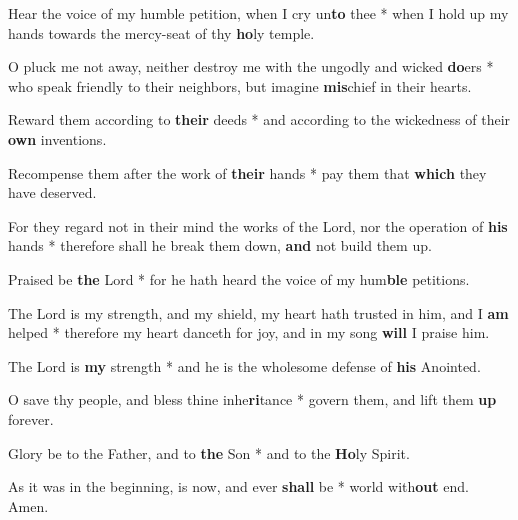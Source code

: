\begin{multicols}{2}
	Hear the voice of my humble petition, when I cry un\textbf{to} thee * when I hold up my hands towards the mercy-seat of thy \textbf{ho}ly temple.
	
	O pluck me not away, neither destroy me with the ungodly and wicked \textbf{do}ers * who speak friendly to their neighbors, but imagine \textbf{mis}chief in their hearts.
	
	Reward them according to \textbf{their} deeds * and according to the wickedness of their \textbf{own} inventions.
	
	Recompense them after the work of \textbf{their} hands * pay them that \textbf{which} they have deserved.
	
	For they regard not in their mind the works of the Lord, nor the operation of \textbf{his} hands * therefore shall he break them down, \textbf{and} not build them up.
	
	Praised be \textbf{the} Lord * for he hath heard the voice of my hum\textbf{ble} petitions.
	
	The Lord is my strength, and my shield, my heart hath trusted in him, and I \textbf{am} helped * therefore my heart danceth for joy, and in my song \textbf{will} I praise him.
	
	The Lord is \textbf{my} strength * and he is the wholesome defense of \textbf{his} Anointed.
	
	O save thy people, and bless thine inhe\textbf{ri}tance * govern them, and lift them \textbf{up} forever.
	
	Glory be to the Father, and to \textbf{the} Son * and to the \textbf{Ho}ly Spirit.
	
	As it was in the beginning, is now, and ever \textbf{shall} be * world with\textbf{out} end. Amen.
\end{multicols}